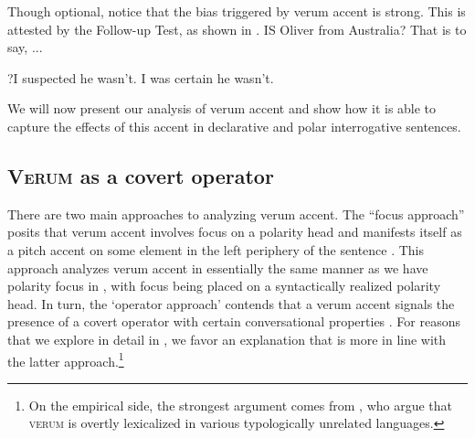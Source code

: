 \documentclass[output=paper,colorlinks,citecolor=brown]{langscibook}
\begin{document}
Though optional, notice that the bias triggered by verum accent is strong. This is attested by the Follow-up Test, as shown in .
\is{}
\ea IS Oliver from Australia? That is to say, ...\label{Vrm.Q.Str} 
    \begin{xlist}
        \ex ?I suspected he wasn't.
        \ex I was certain he wasn't.
    \end{xlist}
\z
\il{}

We will now present our analysis of verum accent and show how it is able to capture the effects of this accent in declarative and polar interrogative sentences.

\subsection{\textsc{Verum} as a covert operator}\label{Vrm.CovOp}
There are two main approaches to analyzing verum accent. The ``focus approach'' posits that verum accent involves focus on a polarity head and manifests itself as a pitch accent on some element in the left periphery of the sentence \citep{Laka1990, Wilder2013, Samko2016, Goodhue2018a}. This approach analyzes verum accent in essentially the same manner as we have polarity focus in , with focus being placed on a syntactically realized polarity head. In turn, the `operator approach' contends that a verum accent signals the presence of a covert operator with certain conversational properties \citep{romero2004, Repp2012, Goodhue2019, Gutzmann2020}. For reasons that we explore in detail in \citet{Bill2021}, we favor an explanation that is more in line with the latter approach.\footnote{On the empirical side, the strongest argument comes from \citet{Gutzmann2020}, who argue that \textsc{verum} is overtly lexicalized in various typologically unrelated languages.}
\end{document}
